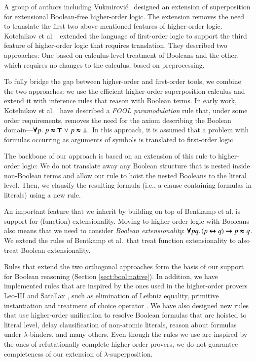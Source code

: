 A group of authors including Vukmirovi\'c\ \cite{bbtvw-21-sup-lam} designed an
extension of superposition for extensional Boolean-free higher-order logic. The extension removes the need to translate the
first two above mentioned features of higher-order logic. Kotelnikov et al.\
\cite{kotelnikov-15-fool,kotelnikov-16-fool} extended the language of
first-order logic to support the third feature of higher-order logic that
requires translation. They described two approaches: One based on calculus-level
treatment of Booleans and the other, which requires no changes to the calculus,
based on preprocessing.

 To fully bridge the gap between higher-order and first-order tools,
we combine the two approaches: we use the efficient higher-order superposition
calculus and extend it with inference rules that reason with
Boolean terms. In early work, Kotelnikov et al.\ 
\cite{kotelnikov-15-fool} have described a \emph{FOOL paramodulation}
rule that, under some order requirements, removes the need for the axiom
describing the Boolean domain---$\pmb\forall p. \; p \pmb\approx \pmb\top \mathrel\lor p
\pmb\approx \pmb\bot$. In this approach, it is assumed that a problem with formulas occurring as
arguments of symbols is translated to first-order logic. 

The backbone of our approach is based on an extension of this rule to higher-order
logic: We do not translate away any Boolean structure that is nested inside
non-Boolean terms and allow our rule to hoist the nested Booleans to the
literal level. Then, we clausify the resulting formula (i.e., a clause containing formulas in literals) using a new rule.


 An important feature that we inherit by building on top of Bentkamp
et al. \cite{bbtvw-21-sup-lam} is support for (function) extensionality. Moving to higher-order
logic with Booleans also means that we need to consider \emph{Boolean extensionality}: $\pmb\forall pq. \, (p
\pmb\leftrightarrow q) \pmb\rightarrow p \pmb\approx q$. We extend the rules of Bentkamp et al.\ 
that treat function extensionality to also treat Boolean extensionality.

\looseness=-1
Rules that extend the two orthogonal approaches form the basis of our support
for Boolean reasoning (Section \ref{sect:bool:native}). In addition, we have
implemented rules that are inspired by the ones used in the
higher-order provers Leo-III \cite{sb-21-leo3} and Satallax
\cite{cb-12-satallax}, such as elimination of Leibniz equality, primitive
instantiation and treatment of choice operator \cite{pa-01-classical-ty-thy}. We
have also designed new rules that use higher-order unification to resolve
Boolean formulas that are hoisted to literal level, delay clausification of non-atomic
literals, reason about formulas under $\lambda$-binders, and many others. Even
though the rules we use are inspired by the ones of refutationally complete
higher-order provers, we do not guarantee completeness of our extension of
$\lambda$-superposition.


